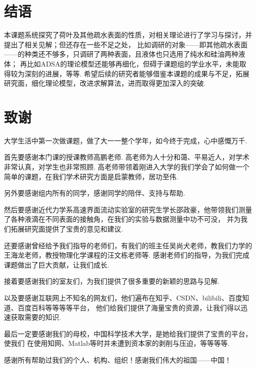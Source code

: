 \documentclass[a4paper,12pt]{article}%
\begin{document}
\section{结语}%
\begin{spacing}{1.528}%
本课题系统探究了荷叶及其他疏水表面的性质，对相关理论进行了学习与探讨，并提出了相关见解；但还存在一些不足之处，
比如调研的对象——即其他疏水表面——的种类还不够多，只调研了两种表面，且液体也只选用了纯水和硅油两种液体；
再比如ADSA的理论模型还能够再细化，但碍于课题组的学业水平，未能取得较为深刻的进展，等等. 
希望后续的研究者能够借鉴本课题的成果与不足，拓展研究面，细化理论模型，改进求解算法，进而取得更加深入的突破. 
\end{spacing}

\section{致谢}%
\begin{spacing}{1.528}%
大学生活中第一次做课题，做了大一一整个学年，如今终于完成，心中感慨万千. 

首先要感谢本门课的授课教师高鹏老师. 高老师为人十分和蔼、平易近人，对学术非常认真，对学生也非常照顾. 
高老师带领着刚进入大学的我们学会了如何做一个简单的课题，在我们学术研究方面是启蒙教师，居功至伟. 

另外要感谢组内所有的同学，感谢同学的陪伴、支持与帮助. 

然后要感谢近代力学系高速界面流动实验室的研究生学长邵政豪，他带领我们测量了各种液滴在不同表面的接触角，在我们的实验与数据测量中功不可没，
并为我们拓展研究面提供了宝贵的意见和建议. 

还要感谢曾经给予我们指导的老师们，有我们的班主任吴尚犬老师，教我们力学的王海龙老师，教授物理化学课程的汪文栋老师等. 
感谢老师们的指导，为我们完成课题做出了巨大贡献，让我们成长. 

接着要感谢我们的室友们，为我们提供了很多重要的新颖的思路与见解. 

以及要感谢互联网上不知名的网友们，他们遍布在知乎、CSDN、bilibili、百度知道、百度百科等等等等平台，
他们给我们提供了海量宝贵的资源，让我们得以迅速获取需要的知识. 

最后一定要感谢我们的母校，中国科学技术大学，是她给我们提供了宝贵的平台，使我们
在使用知网、Matlab等时并未遭到资本家的剥削与压迫，等等等等. 

感谢所有帮助过我们的个人、机构、组织！感谢我们伟大的祖国——中国！

\rightline{\today}
\end{spacing}
\end{document}
